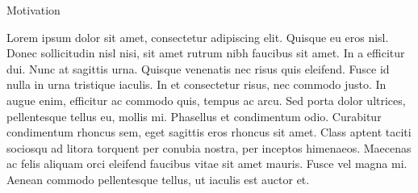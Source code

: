 %
%

\begin{section}{Motivation}

Lorem ipsum dolor sit amet, consectetur adipiscing elit. Quisque eu eros nisl. Donec sollicitudin nisl nisi, sit amet rutrum nibh faucibus sit amet. In a efficitur dui. Nunc at sagittis urna. Quisque venenatis nec risus quis eleifend. Fusce id nulla in urna tristique iaculis. In et consectetur risus, nec commodo justo. In augue enim, efficitur ac commodo quis, tempus ac arcu. Sed porta dolor ultrices, pellentesque tellus eu, mollis mi. Phasellus et condimentum odio. Curabitur condimentum rhoncus sem, eget sagittis eros rhoncus sit amet. Class aptent taciti sociosqu ad litora torquent per conubia nostra, per inceptos himenaeos. Maecenas ac felis aliquam orci eleifend faucibus vitae sit amet mauris. Fusce vel magna mi. Aenean commodo pellentesque tellus, ut iaculis est auctor et.

\end{section}

